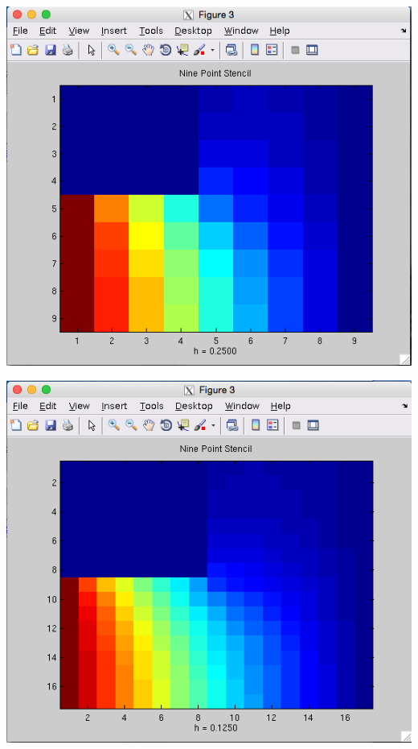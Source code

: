 \documentclass[11pt, oneside]{article}   	%
\begin{document}
\centerline{\includegraphics[scale = 0.55]{NinePoint_h2.png}}

\centerline{\includegraphics[scale = 0.55]{NinePoint_h3.png}}
\end{document}
